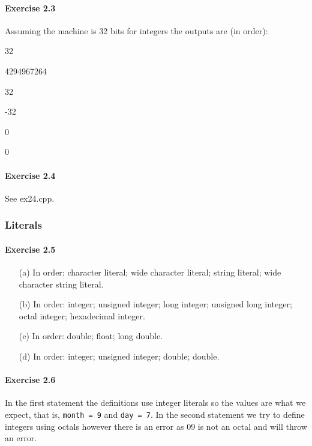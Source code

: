 \paragraph{Exercise 2.3}
Assuming the machine is 32 bits for integers the outputs are (in order):
\begin{itemize}
	\begin{multicols}{2}
		\item 32
		\item 4294967264
		\item 32
		\item -32
		\item 0
		\item 0
	\end{multicols}
\end{itemize}

\paragraph{Exercise 2.4}
See ex24.cpp.

\subsubsection{Literals}

\paragraph{Exercise 2.5}
\begin{itemize}
	\item [(a)]
		In order: character literal; wide character literal; string literal; wide character string literal.
	\item [(b)]
		In order: integer; unsigned integer; long integer; unsigned long integer; octal integer; hexadecimal integer.
	\item [(c)]
		In order: double; float; long double.
	\item [(d)]
		In order: integer; unsigned integer; double; double.
\end{itemize}

\paragraph{Exercise 2.6}
In the first statement the definitions use integer literals so the values are what we expect, that is, \texttt{month = 9} and \texttt{day = 7}. In the second statement we try to define integers using octals however there is an error as 09 is not an octal and will throw an error.

